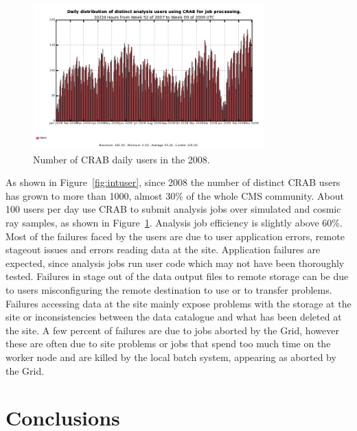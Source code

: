 \begin{figure}
\includegraphics[width=3.5in]{figures/crabusersdaily.png}
\caption{Number of CRAB daily users in the 2008. }
\label{fig:distusers}
\end{figure}

As shown in Figure~\ref{fig:intuser}, since 2008 the number of distinct
CRAB users has grown to more than 1000, almost 30\% of the whole CMS
community.  About 100 users per day use CRAB to submit analysis jobs
over simulated and cosmic ray samples, as shown in
Figure~\ref{fig:distusers}.
Analysis job efficiency is slightly above 60\%. Most of the failures
faced by the users are due to user application errors, remote stageout
issues and errors reading data at the site. Application failures are
expected, since analysis jobs run user code which may not have been
thoroughly tested.  Failures in stage out of the data output files to
remote storage can be due to users misconfiguring the remote
destination to use or to transfer problems.  Failures accessing data
at the site mainly expose problems with the storage at the site or
inconsistencies between the data catalogue and what has been deleted at
the site.  A few percent of failures are due to jobs aborted by the
Grid, however these are often due to site problems or jobs that spend
too much time on the worker node and are killed by the local batch
system, appearing as aborted by the Grid.


\section{Conclusions}
\label{sec:5}

